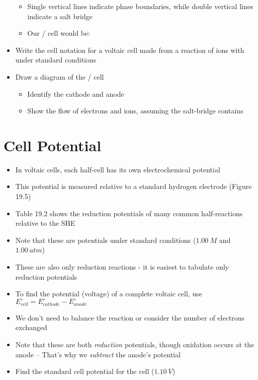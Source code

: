 \documentclass[12pt, openany, letterpaper]{memoir}
\begin{document}
\begin{itemize}
\begin{itemize}
 		\item Single vertical lines indicate phase boundaries, while double vertical lines indicate a salt bridge
 		\item Our / cell would be: 
 	\end{itemize}
 	\item Write the cell notation for a voltaic cell made from a reaction of  ions with  under standard conditions
 	\item Draw a diagram of the / cell
 	\begin{itemize}
 		\item Identify the cathode and anode
 		\item Show the flow of electrons and ions, assuming the salt-bridge contains 
 	\end{itemize} 
\end{itemize}
\section{Cell Potential}
\begin{itemize}
	\item In voltaic cells, each half-cell has its own electrochemical potential
	\item This potential is measured relative to a standard hydrogen electrode (Figure 19.5)
	\item Table 19.2 shows the reduction potentials of many common half-reactions relative to the SHE
	\item Note that these are potentials under standard conditions ($1.00~M$ and $1.00~atm$)
	\item These are also only reduction reactions - it is easiest to tabulate only reduction potentials
	\item To find the potential (voltage) of a complete voltaic cell, use $E^\circ_{cell}=E^\circ_{cathode}-E^\circ_{anode}$
	\item We don't need to balance the reaction or consider the number of electrons exchanged
	\item Note that these are both \emph{reduction} potentials, though oxidation occurs at the anode -- That's why we \emph{subtract} the anode's potential
	\item Find the standard cell potential for the  cell ($1.10~V$)
\end{itemize}
\end{document}
